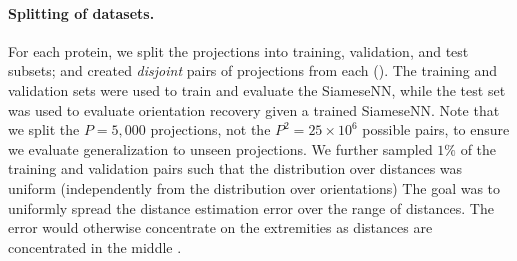 \paragraph{Splitting of datasets.}
For each protein, we split the projections into training, validation, and test subsets; and created \textit{disjoint} pairs of projections from each ().
The training and validation sets were used to train and evaluate the SiameseNN, while the test set was used to evaluate orientation recovery given a trained SiameseNN.
Note that we split the $P=5,000$ projections, not the $P^2 = 25 \times 10^6$ possible pairs, to ensure we evaluate generalization to unseen projections.
We further sampled $1\%$ of the training and validation pairs such that the distribution over distances was uniform (independently from the distribution over orientations) 
The goal was to uniformly spread the distance estimation error over the range of distances.
The error would otherwise concentrate on the extremities as distances are concentrated in the middle .

